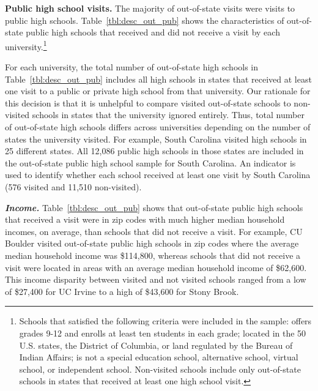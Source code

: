\documentclass[twoside]{article}
\begin{document}
\textbf{Public high school visits.} The majority of out-of-state visits were visits to public high schools. Table~\ref{tbl:desc_out_pub} shows the characteristics of out-of-state public high schools that received and did not receive a visit by each university.\footnote{Schools that satisfied the following criteria were included in the sample: offers grades 9-12 and enrolls at least ten students in each grade; located in the 50 U.S. states, the District of Columbia, or land regulated by the Bureau of Indian Affairs; is not a special education school, alternative school, virtual school, or independent school. Non-visited schools include only out-of-state schools in states that received at least one high school visit.}




For each university, the total number of out-of-state high schools in Table~\ref{tbl:desc_out_pub} includes all high schools in states that received at least one visit to a public or private high school from that university.  Our rationale for this decision is that it is unhelpful to compare visited out-of-state schools to non-visited schools in states that the university ignored entirely. Thus, total number of out-of-state high schools differs across universities depending on the number of states the university visited.  For example, South Carolina visited high schools in 25 different states. All 12,086 public high schools in those states are included in the out-of-state public high school sample for South Carolina. An indicator is used to identify whether each school received at least one visit by South Carolina (576 visited and 11,510 non-visited).


\textbf{\textit{Income.}} Table~\ref{tbl:desc_out_pub} shows that out-of-state public high schools that received a visit were in zip codes with much higher median household incomes, on average, than schools that did not receive a visit. For example, CU Boulder visited out-of-state public high schools in zip codes where the average median household income was \$114,800, whereas schools that did not receive a visit were located in areas with an average median household income of \$62,600. This income disparity between visited and not visited schools ranged from a low of \$27,400 for UC Irvine to a high of \$43,600 for Stony Brook. %
\end{document}
